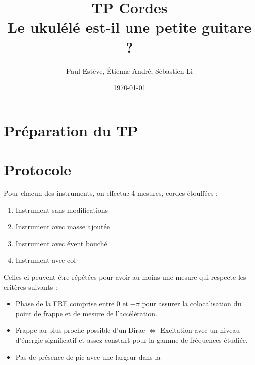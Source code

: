 \documentclass[atiam, article]{rapport} %
\title{TP Cordes\\Le ukulélé est-il une petite guitare ?}
\author{Paul Estève, Étienne André, Sébastien Li} %
\date{\today}
\begin{document}
\maketitle


\section{Préparation du TP}


\section{Protocole}

Pour chacun des instruments, on effectue 4 mesures, cordes étouffées :
\begin{enumerate}
    \item Instrument sans modifications
    \item Instrument avec masse ajoutée
    \item Instrument avec évent bouché
    \item Instrument avec col
\end{enumerate}

Celles-ci peuvent être répétées pour avoir au moins une mesure qui respecte les critères suivants :

\begin{itemize}
    \item Phase de la FRF comprise entre $0$ et $-\pi$ pour assurer la colocalisation du point de frappe et de mesure de l'accélération.
    \item Frappe au plus proche possible d'un Dirac $\Leftrightarrow$ Excitation avec un niveau d'énergie significatif et assez constant pour la gamme de fréquences étudiée.
    \item Pas de présence de pic avec une largeur dans la 
\end{itemize}
\end{document}
